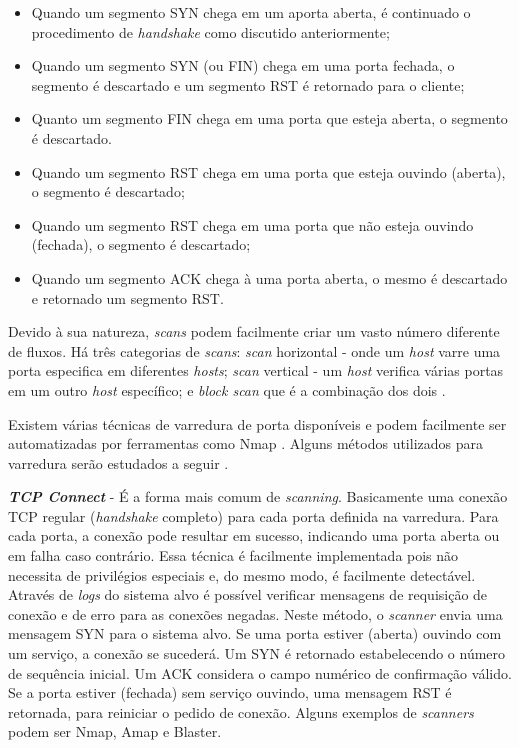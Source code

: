 \begin{itemize}
    \item Quando um segmento SYN chega em um aporta aberta, é continuado o procedimento de \textit{handshake} como discutido anteriormente; 
    \item Quando um segmento SYN (ou FIN) chega em uma porta fechada, o segmento é descartado e um segmento RST é retornado para o cliente;
    \item Quanto um segmento FIN chega em uma porta que esteja aberta, o segmento é descartado.
    \item Quando um segmento RST chega em uma porta que esteja ouvindo (aberta), o segmento é descartado;
    \item Quando um segmento RST chega em uma porta que não esteja ouvindo (fechada), o segmento é descartado;
    \item Quando um segmento ACK chega à uma porta aberta, o mesmo é descartado e retornado um segmento RST.
\end{itemize}


Devido à sua natureza, \textit{scans} podem facilmente criar um vasto número diferente de fluxos.
Há três categorias de \textit{scans}: \textit{scan} horizontal - onde um \textit{host} varre uma porta especifica em diferentes \textit{hosts}; \textit{scan} vertical - um \textit{host} verifica várias portas em um outro \textit{host} específico; e \textit{block scan} que é a combinação dos dois \cite{Sperotto:2010}.

Existem várias técnicas de varredura de porta disponíveis e podem facilmente ser automatizadas por ferramentas como Nmap \cite{Lyon:2009}. Alguns métodos utilizados para varredura serão estudados a seguir \cite{deVivo:1999, Christopher:2001}.

\textbf{\textit{TCP Connect}} - É a forma mais comum de \textit{scanning}. Basicamente uma conexão TCP regular (\textit{handshake} completo) para cada porta definida na varredura. Para cada porta, a conexão pode resultar em sucesso, indicando uma porta aberta ou em falha caso contrário. Essa técnica é facilmente implementada pois não necessita de privilégios especiais e, do mesmo modo, é facilmente detectável. Através de \textit{logs} do sistema alvo é possível verificar mensagens de requisição de conexão e de erro para as conexões negadas. Neste método, o \textit{scanner} envia uma mensagem SYN para o sistema alvo. Se uma porta estiver (aberta) ouvindo com um serviço, a conexão se sucederá. Um SYN é retornado estabelecendo o número de sequência inicial. Um ACK considera o campo numérico de confirmação válido. Se a porta estiver (fechada) sem serviço ouvindo, uma mensagem RST é retornada, para reiniciar o pedido de conexão. Alguns exemplos de \textit{scanners} podem ser Nmap, Amap e Blaster. %

